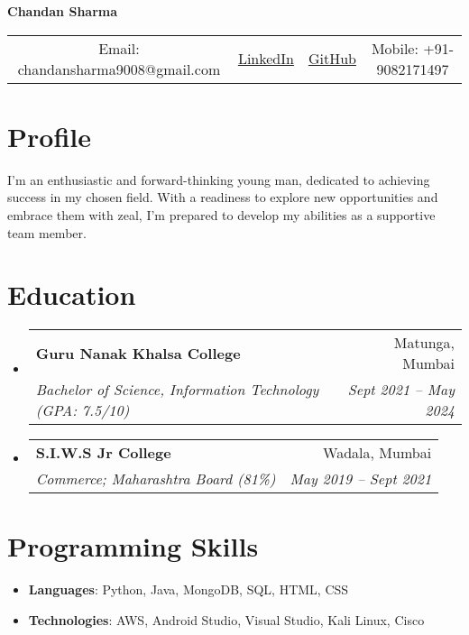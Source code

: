 \documentclass[a4paper,11pt]{article}
\makeatletter
\newcommand{\resumeItem}[2]{
  \item\small{
    \textbf{#1}{ #2 \vspace{-2pt}}
  }
}
\newcommand{\resumeSubheading}[4]{
  \vspace{-1pt}\item
    \begin{tabular*}{0.97\textwidth}{l@{\extracolsep{\fill}}r}
      \textbf{#1} & #2 \\
      \textit{\small#3} & \textit{\small #4} \\
    \end{tabular*}\vspace{-5pt}
}
\newcommand{\resumeSubItem}[2]{\resumeItem{#1}{#2}\vspace{-4pt}}
\newcommand{\resumeSubHeadingListStart}{\begin{itemize}[leftmargin=*]}
\newcommand{\resumeSubHeadingListEnd}{\end{itemize}\vspace{-5pt}}
\makeatother
\begin{document}
\begin{center}
  \textbf{\LARGE Chandan Sharma} \\
  \vspace{0.3cm} %
  \begin{tabular}{c c c c}
    Email: {chandansharma9008@gmail.com} &
    \hspace{1cm} %
    \href{https://www.linkedin.com/in/chandan-sharma-2807262a4/}{LinkedIn} &
    \hspace{1cm} %
    \href{https://github.com/ChandanSharma22}{GitHub} &
    \hspace{1cm} %
    Mobile: +91-9082171497 \\
  \end{tabular}
\end{center}

\section{Profile}
\resumeItem{}{I'm an enthusiastic and forward-thinking young man, dedicated to achieving success in my chosen field. With a readiness to explore new opportunities and embrace them with zeal, I'm prepared to develop my abilities as a supportive team member.}

\section{Education}
  \resumeSubHeadingListStart
    \resumeSubheading
      {Guru Nanak Khalsa College}{Matunga, Mumbai}
      {Bachelor of Science, Information Technology (GPA: 7.5/10)}{Sept 2021 -- May 2024}
      
    \resumeSubheading
      {S.I.W.S Jr College}{Wadala, Mumbai}
      {Commerce; Maharashtra Board (81\%)}{May 2019 -- Sept 2021}
  \resumeSubHeadingListEnd
  \vspace{0.5cm} %

    \section{Programming Skills}
 \resumeSubHeadingListStart
    \resumeSubItem{}{ 
      \textbf{Languages}{: Python, Java, MongoDB, SQL, HTML, CSS}
    }
    \resumeSubItem{}{
      \textbf{Technologies}{: AWS, Android Studio, Visual Studio, Kali Linux, Cisco}
    }
  \resumeSubHeadingListEnd
  \vspace{0.5cm} %
\end{document}
